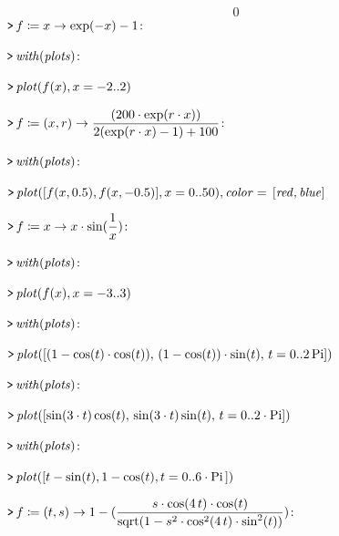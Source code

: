\documentclass{article}
\begin{document}
\begin{dmath}\label{(16)}
0
\end{dmath}
\mapleinput
{$ \displaystyle \texttt{>\,} f \coloneqq x \rightarrow \exp (-x)-1\colon  $}

\mapleinput
{$ \displaystyle \texttt{>\,} \mathit{with} (\mathit{plots})\colon  $}

\mapleinput
{$ \displaystyle \texttt{>\,} \mathit{plot} (f (x),x =-2..2) $}

{}
\mapleinput
{$ \displaystyle \texttt{>\,} f \coloneqq (x ,r)\rightarrow \frac{(200\cdot \exp (r \cdot x))}{2(\exp (r \cdot x)-1)+100}\colon  $}

\mapleinput
{$ \displaystyle \texttt{>\,} \mathit{with} (\mathit{plots})\colon  $}

\mapleinput
{$ \displaystyle \texttt{>\,} \mathit{plot} ([f (x , 0.5),f (x ,- 0.5)],x =0..50),\mathit{color} =\,[\mathit{red} ,\mathit{blue}] $}

\mapleinput
{$ \displaystyle \texttt{>\,} f \coloneqq x \rightarrow x \cdot \sin (\frac{1}{x})\colon  $}

\mapleinput
{$ \displaystyle \texttt{>\,} \mathit{with} (\mathit{plots})\colon  $}

\mapleinput
{$ \displaystyle \texttt{>\,} \mathit{plot} (f (x),x =-3..3) $}

{}
\mapleinput
{$ \displaystyle \texttt{>\,} \mathit{with} (\mathit{plots})\colon  $}

\mapleinput
{$ \displaystyle \texttt{>\,} \mathit{plot} ([(1-\cos (t)\cdot \cos (t)),\,(1-\cos (t))\cdot \sin (t),\,t =0..2\,\mathrm{Pi}]) $}

{}
\mapleinput
{$ \displaystyle \texttt{>\,} \mathit{with} (\mathit{plots})\colon  $}

\mapleinput
{$ \displaystyle \texttt{>\,} \mathit{plot} ([\sin (3\cdot t)\cos (t),\,\sin (3\cdot t)\sin (t),\,t =0..2\cdot \mathrm{Pi}]) $}

{}
\mapleinput
{$ \displaystyle \texttt{>\,} \mathit{with} (\mathit{plots})\colon  $}

\mapleinput
{$ \displaystyle \texttt{>\,} \mathit{plot} ([t -\sin (t),1-\cos (t),t =0..6\cdot \mathrm{Pi}\,]) $}

{}
\mapleinput
{$ \displaystyle \texttt{>\,} f \coloneqq (t ,s)\rightarrow 1-(\frac{s \cdot \cos (4\,t)\cdot \cos (t)}{\mathrm{sqrt}(1-s^{2}\cdot \cos^{2}(4\,t)\cdot \sin^{2}(t))})\colon  $}
\end{document}

